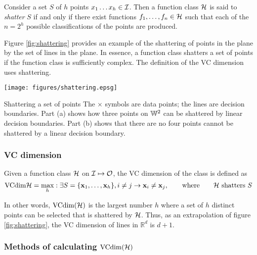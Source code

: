 \begin{definition}[Shattering]
Consider a set $S$ of $h$ points $x_1 \ldots x_h \in \mathcal{I}$.  Then a
function class $\mathcal{H}$ is said to \emph{shatter} $S$ if and only if
there exist functions $f_1, \ldots, f_n \in \mathcal{H}$ such that each of
the $n = 2^h$ possible classifications of the points are produced.
\end{definition}

Figure \ref{fig:shattering} provides an example of the shattering of
points in the plane by the set of lines in the plane.  In essence, a
function class shatters a set of points if the function class is
sufficiently complex.  The definition of the VC dimension uses shattering.

\begin{linefigure}
\begin{center}
\texttt{[image: figures/shattering.epsg]}
\end{center}
\label{fig:shattering}
\begin{capt}{Shattering a set of points}
The $\times$ symbols are data points; the lines are decision boundaries.
Part (a) shows how three points on $\mathbb{W}^2$ can be shattered by linear
decision boundaries.  Part (b) shows that there are no four points
cannot be shattered by a linear decision boundary.
\end{capt}
\end{linefigure}


\subsubsection{VC dimension}

\begin{definition}[VC dimension]
Given a function class $\mathcal{H}$ on $\mathcal{I} \mapsto \mathcal{O}$, the VC
dimension of the class is defined as
%
\begin{equation}
\mathrm{VCdim}{\mathcal{H}} = \max_{h} : \exists S = \{\mathbf{x}_1, \ldots, \mathbf{x}_h\},
i \neq j \rightarrow \mathbf{x}_i \neq \mathbf{x}_j,
\qquad \mbox{where} \qquad \mbox{\ensuremath{\mathcal{H}}\ shatters $S$}
\end{equation}
\end{definition}

In other words, $\mathrm{VCdim}(\mathcal{H})$ is the largest number $h$ where
a set of $h$ distinct points can be selected that is shattered by
$\mathcal{H}$.  Thus, as an extrapolation of figure \ref{fig:shattering}, the VC dimension of
lines in $\mathbb{R}^d$ is $d+1$.


\subsubsection{Methods of calculating $\mathrm{VCdim}(\mathcal{H})$}


